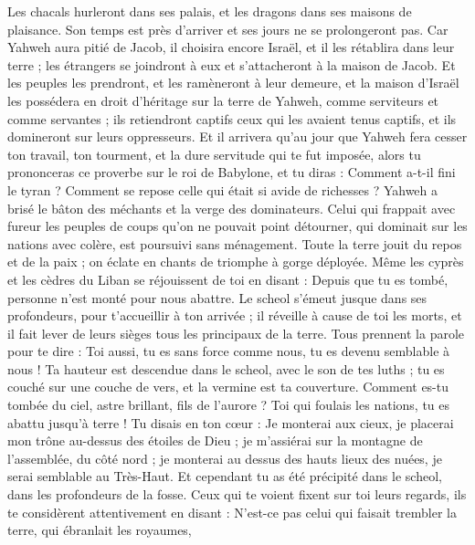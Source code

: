 \begin{multicols}{2}
Les chacals hurleront dans ses palais, et les dragons dans ses maisons de plaisance. Son temps est près d'arriver et ses jours ne se prolongeront pas.
\VerseOne{}Car Yahweh aura pitié de Jacob, il choisira encore Israël, et il les rétablira dans leur terre ; les étrangers se joindront à eux et s'attacheront à la maison de Jacob.
Et les peuples les prendront, et les ramèneront à leur demeure, et la maison d'Israël les possédera en droit d'héritage sur la terre de Yahweh, comme serviteurs et comme servantes ; ils retiendront captifs ceux qui les avaient tenus captifs, et ils domineront sur leurs oppresseurs.
Et il arrivera qu'au jour que Yahweh fera cesser ton travail, ton tourment, et la dure servitude qui te fut imposée,
alors tu prononceras ce proverbe sur le roi de Babylone, et tu diras : Comment a-t-il fini le tyran ? Comment se repose celle qui était si avide de richesses ?
Yahweh a brisé le bâton des méchants et la verge des dominateurs.
Celui qui frappait avec fureur les peuples de coups qu'on ne pouvait point détourner, qui dominait sur les nations avec colère, est poursuivi sans ménagement.
Toute la terre jouit du repos et de la paix ; on éclate en chants de triomphe à gorge déployée.
Même les cyprès et les cèdres du Liban se réjouissent de toi en disant : Depuis que tu es tombé, personne n'est monté pour nous abattre.
Le scheol s'émeut jusque dans ses profondeurs, pour t'accueillir à ton arrivée ; il réveille à cause de toi les morts, et il fait lever de leurs sièges tous les principaux de la terre.
Tous prennent la parole pour te dire : Toi aussi, tu es sans force comme nous, tu es devenu semblable à nous !
Ta hauteur est descendue dans le scheol, avec le son de tes luths ; tu es couché sur une couche de vers, et la vermine est ta couverture.
Comment es-tu tombée du ciel, astre brillant, fils de l'aurore ? Toi qui foulais les nations, tu es abattu jusqu'à terre !
Tu disais en ton cœur : Je monterai aux cieux, je placerai mon trône au-dessus des étoiles de Dieu ; je m'assiérai sur la montagne de l'assemblée, du côté nord ;
je monterai au dessus des hauts lieux des nuées, je serai semblable au Très-Haut.
Et cependant tu as été précipité dans le scheol, dans les profondeurs de la fosse.
Ceux qui te voient fixent sur toi leurs regards, ils te considèrent attentivement en disant : N'est-ce pas celui qui faisait trembler la terre, qui ébranlait les royaumes,

\end{multicols}
